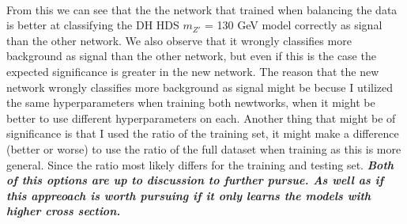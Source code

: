 \documentclass[14pt, a4paper]{book}
\begin{document}
\\From this we can see that the the network that trained when balancing the data is better at classifying the DH HDS $m_{Z'}$ = 130 GeV model correctly as signal than the other network. We also observe that it wrongly classifies more background as signal than the other network, but even if this is the case the expected significance is greater in the new network.
The reason that the new network wrongly classifies more background as signal might be becuse I utilized the same hyperparameters when training both newtworks, when it might be better to use different hyperparameters on each. 
Another thing that might be of significance is that I used the ratio of the training set, it might make a difference (better or worse) to use the ratio of the full dataset when training as this is more general. Since the ratio most likely differs for the training and testing set. \textit{\textbf{Both of this options are up to discussion to further pursue. As well as if this appreoach is worth pursuing if it only learns the models with higher cross section.}}

\clearpage
\end{document}
